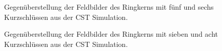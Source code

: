 \begin{figure}[htb]
	\centering
	\caption{Gegen\"uberstellung der Feldbilder des Ringkerns mit f\"unf und sechs Kurzschl\"ussen aus der CST Simulation.}
	\label{fig:field56ks}
\end{figure}

\begin{figure}[htb]
	\centering
	\caption{Gegen\"uberstellung der Feldbilder des Ringkerns mit sieben und acht Kurzschl\"ussen aus der CST Simulation.}
	\label{fig:field78ks}
\end{figure}